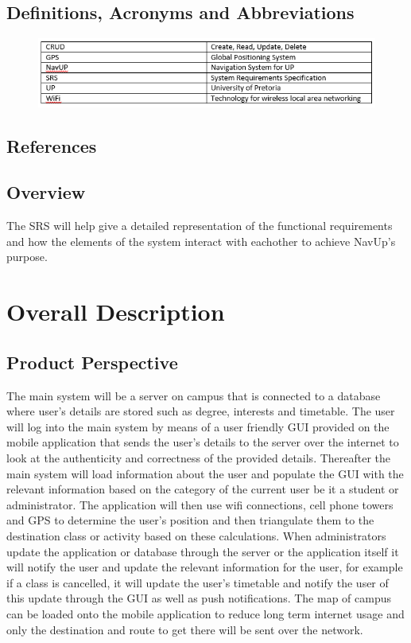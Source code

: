 \documentclass{article}
\begin{document}
	\subsection{Definitions, Acronyms and Abbreviations}
	
	\begin{figure}[h!]
		\includegraphics[scale=1]{Descriptions.PNG}
	\end{figure}
	
	\subsection{References}
	\subsection{Overview}
	The SRS will help give a detailed representation of the functional requirements and how the elements of the system interact with eachother to achieve NavUp's purpose. 
	
	\section{Overall Description}
	\subsection{Product Perspective}

	The main system will be a server on campus that is connected to a database where user's details are stored such as degree, interests and timetable. The user will log into the main system by means of a user friendly GUI provided on the mobile application that sends the user's details to the server over the internet to look at the authenticity and correctness of the provided details. Thereafter the main system will load information about the user and populate the GUI with the relevant information based on the category of the current user be it a student or administrator. The application will then use wifi connections, cell phone towers and GPS to determine the user's position and then triangulate them to the destination class or activity based on these calculations. When administrators update the application or database through the server or the application itself it will notify the user and update the relevant information for the user, for example if a class is cancelled, it will update the user's timetable and notify the user of this update through the GUI as well as push notifications. The map of campus can be loaded onto the mobile application to reduce long term internet usage and only the destination and route to get there will be sent over the network.
\end{document}
